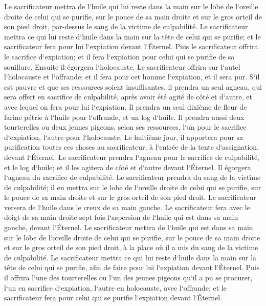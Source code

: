 \verse Le sacrificateur mettra de l`huile qui lui reste dans la main sur le lobe de l`oreille droite de celui qui se purifie, sur le pouce de sa main droite et sur le gros orteil de son pied droit, par-dessus le sang de la victime de culpabilité. 
\verse Le sacrificateur mettra ce qui lui reste d`huile dans la main sur la tête de celui qui se purifie; et le sacrificateur fera pour lui l`expiation devant l`Éternel. 
\verse Puis le sacrificateur offrira le sacrifice d`expiation; et il fera l`expiation pour celui qui se purifie de sa souillure. 
\verse Ensuite il égorgera l`holocauste. Le sacrificateur offrira sur l`autel l`holocauste et l`offrande; et il fera pour cet homme l`expiation, et il sera pur. 
\verse S`il est pauvre et que ses ressources soient insuffisantes, il prendra un seul agneau, qui sera offert en sacrifice de culpabilité, après avoir été agité de côté et d`autre, et avec lequel on fera pour lui l`expiation. Il prendra un seul dixième de fleur de farine pétrie à l`huile pour l`offrande, et un log d`huile. 
\verse Il prendra aussi deux tourterelles ou deux jeunes pigeons, selon ses ressources, l`un pour le sacrifice d`expiation, l`autre pour l`holocauste. 
\verse Le huitième jour, il apportera pour sa purification toutes ces choses au sacrificateur, à l`entrée de la tente d`assignation, devant l`Éternel. 
\verse Le sacrificateur prendra l`agneau pour le sacrifice de culpabilité, et le log d`huile; et il les agitera de côté et d`autre devant l`Éternel. 
\verse Il égorgera l`agneau du sacrifice de culpabilité. Le sacrificateur prendra du sang de la victime de culpabilité; il en mettra sur le lobe de l`oreille droite de celui qui se purifie, sur le pouce de sa main droite et sur le gros orteil de son pied droit. 
\verse Le sacrificateur versera de l`huile dans le creux de sa main gauche. 
\verse Le sacrificateur fera avec le doigt de sa main droite sept fois l`aspersion de l`huile qui est dans sa main gauche, devant l`Éternel. 
\verse Le sacrificateur mettra de l`huile qui est dans sa main sur le lobe de l`oreille droite de celui qui se purifie, sur le pouce de sa main droite et sur le gros orteil de son pied droit, à la place où il a mis du sang de la victime de culpabilité. 
\verse Le sacrificateur mettra ce qui lui reste d`huile dans la main sur la tête de celui qui se purifie, afin de faire pour lui l`expiation devant l`Éternel. 
\verse Puis il offrira l`une des tourterelles ou l`un des jeunes pigeons qu`il a pu se procurer, 
\verse l`un en sacrifice d`expiation, l`autre en holocauste, avec l`offrande; et le sacrificateur fera pour celui qui se purifie l`expiation devant l`Éternel. 
